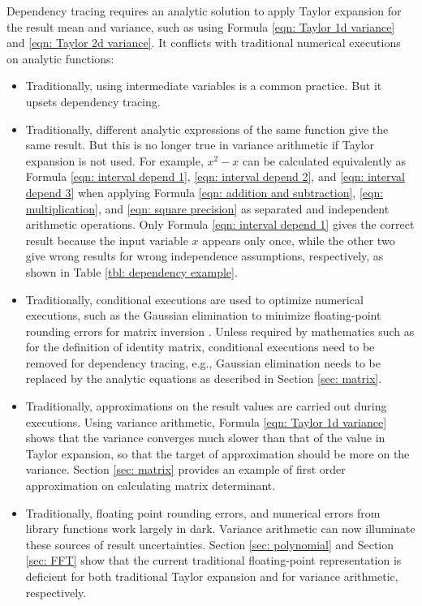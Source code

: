 \documentclass[twoside]{article}
\numberwithin{equation}{section}
\begin{document}
Dependency tracing requires an analytic solution to apply Taylor expansion for the result mean and variance, such as using Formula \eqref{eqn: Taylor 1d variance} and \eqref{eqn: Taylor 2d variance}.
It conflicts with traditional numerical executions on analytic functions:
\begin{itemize}

\item
Traditionally, using intermediate variables is a common practice.
But it upsets dependency tracing.

\item 
Traditionally, different analytic expressions of the same function give the same result.
But this is no longer true in variance arithmetic if Taylor expansion is not used.
For example, $x^2 - x$ can be calculated equivalently as Formula \eqref{eqn: interval depend 1}, \eqref{eqn: interval depend 2}, and \eqref{eqn: interval depend 3} when applying Formula \eqref{eqn: addition and subtraction}, \eqref{eqn: multiplication}, and \eqref{eqn: square precision} as separated and independent arithmetic operations.
Only Formula \eqref{eqn: interval depend 1} gives the correct result because the input variable $x$ appears only once, while the other two give wrong results for wrong independence assumptions, respectively, as shown in Table \ref{tbl: dependency example}.

\item
Traditionally, conditional executions are used to optimize numerical executions, such as the Gaussian elimination to minimize floating-point rounding errors for matrix inversion \cite{Linear_Algebra}.  
Unless required by mathematics such as for the definition of identity matrix, conditional executions need to be removed for dependency tracing, e.g., Gaussian elimination needs to be replaced by the analytic equations as described in Section \ref{sec: matrix}.

\item 
Traditionally, approximations on the result values are carried out during executions.
Using variance arithmetic, Formula \eqref{eqn: Taylor 1d variance} shows that the variance converges much slower than that of the value in Taylor expansion, so that the target of approximation should be more on the variance.
Section \ref{sec: matrix} provides an example of first order approximation on calculating matrix determinant.

\item
Traditionally, floating point rounding errors, and numerical errors from library functions work largely in dark.
Variance arithmetic can now illuminate these sources of result uncertainties.
Section \ref{sec: polynomial} and Section \ref{sec: FFT} show that the current traditional floating-point representation is deficient for both traditional Taylor expansion and for variance arithmetic, respectively.


\end{itemize}
\end{document}
